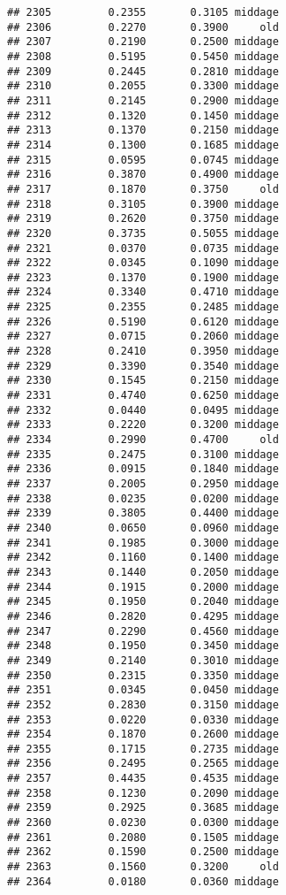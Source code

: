 \documentclass[
]{article}
\begin{document}
\begin{verbatim}
## 2305         0.2355       0.3105 middage
## 2306         0.2270       0.3900     old
## 2307         0.2190       0.2500 middage
## 2308         0.5195       0.5450 middage
## 2309         0.2445       0.2810 middage
## 2310         0.2055       0.3300 middage
## 2311         0.2145       0.2900 middage
## 2312         0.1320       0.1450 middage
## 2313         0.1370       0.2150 middage
## 2314         0.1300       0.1685 middage
## 2315         0.0595       0.0745 middage
## 2316         0.3870       0.4900 middage
## 2317         0.1870       0.3750     old
## 2318         0.3105       0.3900 middage
## 2319         0.2620       0.3750 middage
## 2320         0.3735       0.5055 middage
## 2321         0.0370       0.0735 middage
## 2322         0.0345       0.1090 middage
## 2323         0.1370       0.1900 middage
## 2324         0.3340       0.4710 middage
## 2325         0.2355       0.2485 middage
## 2326         0.5190       0.6120 middage
## 2327         0.0715       0.2060 middage
## 2328         0.2410       0.3950 middage
## 2329         0.3390       0.3540 middage
## 2330         0.1545       0.2150 middage
## 2331         0.4740       0.6250 middage
## 2332         0.0440       0.0495 middage
## 2333         0.2220       0.3200 middage
## 2334         0.2990       0.4700     old
## 2335         0.2475       0.3100 middage
## 2336         0.0915       0.1840 middage
## 2337         0.2005       0.2950 middage
## 2338         0.0235       0.0200 middage
## 2339         0.3805       0.4400 middage
## 2340         0.0650       0.0960 middage
## 2341         0.1985       0.3000 middage
## 2342         0.1160       0.1400 middage
## 2343         0.1440       0.2050 middage
## 2344         0.1915       0.2000 middage
## 2345         0.1950       0.2040 middage
## 2346         0.2820       0.4295 middage
## 2347         0.2290       0.4560 middage
## 2348         0.1950       0.3450 middage
## 2349         0.2140       0.3010 middage
## 2350         0.2315       0.3350 middage
## 2351         0.0345       0.0450 middage
## 2352         0.2830       0.3150 middage
## 2353         0.0220       0.0330 middage
## 2354         0.1870       0.2600 middage
## 2355         0.1715       0.2735 middage
## 2356         0.2495       0.2565 middage
## 2357         0.4435       0.4535 middage
## 2358         0.1230       0.2090 middage
## 2359         0.2925       0.3685 middage
## 2360         0.0230       0.0300 middage
## 2361         0.2080       0.1505 middage
## 2362         0.1590       0.2500 middage
## 2363         0.1560       0.3200     old
## 2364         0.0180       0.0360 middage

\end{verbatim}
\end{document}
